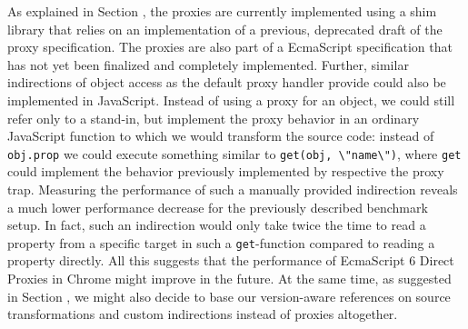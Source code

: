 As explained in Section , the proxies are currently implemented using a shim library that relies on an implementation of a previous, deprecated draft of the proxy specification.
The proxies are also part of a EcmaScript specification that has not yet been finalized and completely implemented.
Further, similar indirections of object access as the default proxy handler provide could also be implemented in JavaScript.
Instead of using a proxy for an object, we could still refer only to a stand-in, but implement the proxy behavior in an ordinary JavaScript function to which we would transform the source code: instead of \lstinline{obj.prop} we could execute something similar to \lstinline{get(obj, \"name\")}, where \lstinline{get} could implement the behavior previously implemented by respective the proxy trap.
Measuring the performance of such a manually provided indirection reveals a much lower performance decrease for the previously described benchmark setup.
In fact, such an indirection would only take twice the time to read a property from a specific target in such a \lstinline{get}-function compared to reading a property directly. 
All this suggests that the performance of EcmaScript 6 Direct Proxies in Chrome might improve in the future.
At the same time, as suggested in Section , we might also decide to base our version-aware references on source transformations and custom indirections instead of proxies altogether.

